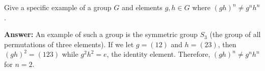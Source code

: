 \item[{\bf 16.}]
Give a specific example of a group $G$ and elements $g, h \in G$ where $(gh)^n \neq g^nh^n$. 

\textbf{Answer:} An example of such a group is the symmetric group $S_3$ (the group of all permutations of three elements). If we let $g = (12)$ and $h = (23)$, then $(gh)^2 = (123)$ while $g^2h^2 = e$, the identity element. Therefore, $(gh)^n \neq g^nh^n$ for $n=2$.
